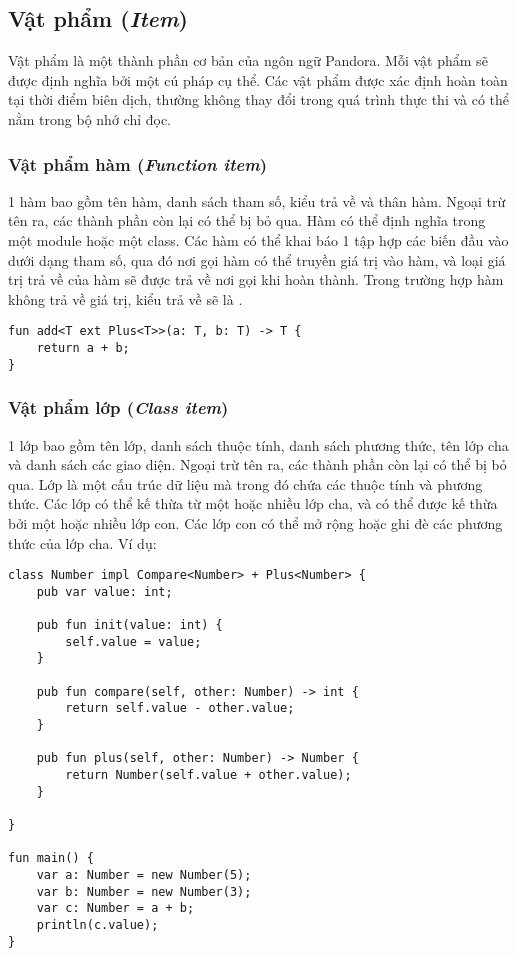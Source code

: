 \subsection{Vật phẩm (\textit{Item})}

\regexitem

Vật phẩm là một thành phần cơ bản của ngôn ngữ Pandora. Mỗi vật phẩm sẽ được định nghĩa bởi một cú pháp cụ thể. Các vật phẩm được xác định hoàn toàn tại thời điểm biên dịch, thường không thay đổi trong quá trình thực thi và có thể nằm trong bộ nhớ chỉ đọc.

\subsubsection{Vật phẩm hàm (\textit{Function item})}          

\regexfunitem

1 hàm bao gồm tên hàm, danh sách tham số, kiểu trả về và thân hàm. Ngoại trừ tên ra, các thành phần còn lại có thể bị bỏ qua. Hàm có thể định nghĩa trong một module hoặc một class. Các hàm có thể khai báo 1 tập hợp các biến đầu vào dưới dạng tham số, qua đó nơi gọi hàm có thể truyền giá trị vào hàm, và loại giá trị trả về của hàm sẽ được trả về nơi gọi khi hoàn thành. Trong trường hợp hàm không trả về giá trị, kiểu trả về sẽ là .

\begin{lstlisting}[]
fun add<T ext Plus<T>>(a: T, b: T) -> T {
    return a + b;
}
\end{lstlisting}

\subsubsection{Vật phẩm lớp (\textit{Class item})}

\regexclassitem

1 lớp bao gồm tên lớp, danh sách thuộc tính, danh sách phương thức, tên lớp cha và danh sách các giao diện. Ngoại trừ tên ra, các thành phần còn lại có thể bị bỏ qua. Lớp là một cấu trúc dữ liệu mà trong đó chứa các thuộc tính và phương thức. Các lớp có thể kế thừa từ một hoặc nhiều lớp cha, và có thể được kế thừa bởi một hoặc nhiều lớp con. Các lớp con có thể mở rộng hoặc ghi đè các phương thức của lớp cha. Ví dụ:

\begin{lstlisting}[]
class Number impl Compare<Number> + Plus<Number> {
    pub var value: int;

    pub fun init(value: int) {
        self.value = value;
    }

    pub fun compare(self, other: Number) -> int {
        return self.value - other.value;
    }

    pub fun plus(self, other: Number) -> Number {
        return Number(self.value + other.value);
    }

}

fun main() {
    var a: Number = new Number(5);
    var b: Number = new Number(3);
    var c: Number = a + b;
    println(c.value);
}
\end{lstlisting}

